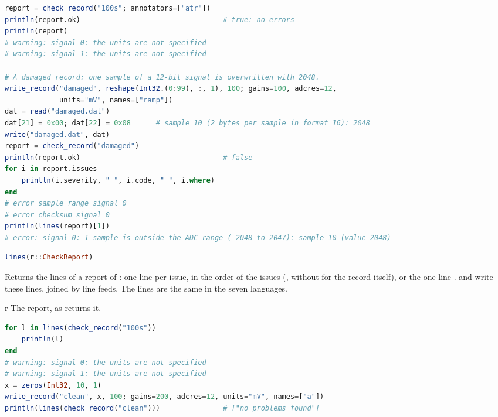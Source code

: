 \begin{lstlisting}[language=Julia,style=example]
report = check_record("100s"; annotators=["atr"])
println(report.ok)                                  # true: no errors
println(report)
# warning: signal 0: the units are not specified
# warning: signal 1: the units are not specified

# A damaged record: one sample of a 12-bit signal is overwritten with 2048.
write_record("damaged", reshape(Int32.(0:99), :, 1), 100; gains=100, adcres=12,
             units="mV", names=["ramp"])
dat = read("damaged.dat")
dat[21] = 0x00; dat[22] = 0x08      # sample 10 (2 bytes per sample in format 16): 2048
write("damaged.dat", dat)
report = check_record("damaged")
println(report.ok)                                  # false
for i in report.issues
    println(i.severity, " ", i.code, " ", i.where)
end
# error sample_range signal 0
# error checksum signal 0
println(lines(report)[1])
# error: signal 0: 1 sample is outside the ADC range (-2048 to 2047): sample 10 (value 2048)
\end{lstlisting}

\begin{lstlisting}[language=Julia,style=signature]
lines(r::CheckReport)
\end{lstlisting}
Returns the lines of a report of : one line per issue, in the order of
the issues (, without  for the record
itself), or the one line .  and
 write these lines, joined by line feeds. The lines are the same in the
seven languages.
\begin{params}
\item[r] The report, as  returns it.
\end{params}
\begin{lstlisting}[language=Julia,style=example]
for l in lines(check_record("100s"))
    println(l)
end
# warning: signal 0: the units are not specified
# warning: signal 1: the units are not specified
x = zeros(Int32, 10, 1)
write_record("clean", x, 100; gains=200, adcres=12, units="mV", names=["a"])
println(lines(check_record("clean")))               # ["no problems found"]
\end{lstlisting}

